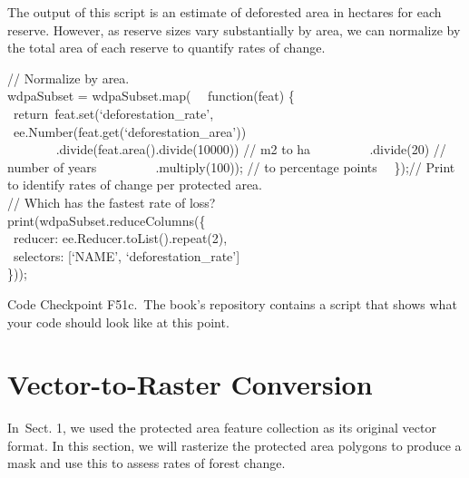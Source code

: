 \documentclass[
  letterpaper,
  DIV=11,
  numbers=noendperiod]{scrreprt}
\begin{document}
The output of this script is an estimate of deforested area in hectares
for each reserve. However, as reserve sizes vary substantially by area,
we can normalize by the total area of each reserve to quantify rates of
change.

// Normalize by area.\\
wdpaSubset = wdpaSubset.map(~ ~function(feat) \{~ ~ ~
~return~feat.set(`deforestation\_rate',~ ~ ~ ~ ~
~ee.Number(feat.get(`deforestation\_area'))\\
\hspace*{0.333em} ~ ~ ~ ~ ~.divide(feat.area().divide(10000)) // m2 to
ha~ ~ ~ ~ ~ ~.divide(20) // number of years~ ~ ~ ~ ~ ~.multiply(100));
// to percentage points~ ~\});// Print to identify rates of change per
protected area.\\
// Which has the fastest rate of loss?\\
print(wdpaSubset.reduceColumns(\{\\
\hspace*{0.333em} ~reducer: ee.Reducer.toList().repeat(2),\\
\hspace*{0.333em} ~selectors: {[}`NAME', `deforestation\_rate'{]}\\
\}));

\begin{tcolorbox}[enhanced jigsaw, left=2mm, breakable, rightrule=.15mm, opacityback=0, colframe=quarto-callout-note-color-frame, colbacktitle=quarto-callout-note-color!10!white, arc=.35mm, opacitybacktitle=0.6, toptitle=1mm, colback=white, leftrule=.75mm, title=\textcolor{quarto-callout-note-color}{\faInfo}\hspace{0.5em}{Note}, toprule=.15mm, bottomtitle=1mm, titlerule=0mm, bottomrule=.15mm, coltitle=black]

Code Checkpoint F51c.~The book's repository contains a script that shows
what your code should look like at this point.

\end{tcolorbox}

\hypertarget{vector-to-raster-conversion}{%
\section{Vector-to-Raster
Conversion}\label{vector-to-raster-conversion}}

In~Sect. 1, we used the protected area feature collection as its
original vector format. In this section, we will rasterize the protected
area polygons to produce a mask and use this to assess rates of forest
change.
\end{document}
